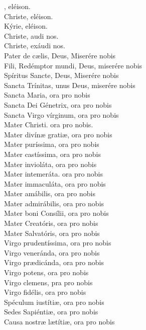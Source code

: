 \documentclass[9pt]{article}
\begin{document}
\begin{multicols*}{2}
    , eléison.\\
    Christe, eléison.\\
    Kýrie, eléison.\\
    Christe, audi nos.\\
    Christe, exáudi nos.\\
    Pater de c{\ae}lis, Deus, Miserére nobis\\
    Fili, Redémptor mundi, Deus, miserére nobis\\
    Spíritus Sancte, Deus, Miserére nobis\\
    Sancta Trínitas, unus Deus, miserére nobis\\
    Sancta Maria, ora pro nobis\\
    Sancta Dei Génetrix, ora pro nobis\\
    Sancta Virgo vírginum, ora pro nobis\\
    Mater Christi. ora pro nobis.\\
    Mater divín{\ae} grati{\ae}, ora pro nobis\\
    Mater puríssima, ora pro nobis\\
    Mater castíssima, ora pro nobis\\
    Mater invioláta, ora pro nobis\\
    Mater intemeráta. ora pro nobis\\
    Mater immaculáta, ora pro nobis\\
    Mater amábilis, ora pro nobis\\
    Mater admirábilis, ora pro nobis\\
    Mater boni Consílii, ora pro nobis\\
    Mater Creatóris, ora pro nobis\\
    Mater Salvatóris, ora pro nobis\\
    Virgo prudentíssima, ora pro nobis\\
    Virgo veneránda, ora pro nobis\\
    Virgo pr{\ae}dicánda, ora pro nobis\\
    Virgo potens, ora pro nobis\\
    Virgo clemens, pra pro nobis\\
    Virgo fidélis, ora pro nobis\\
    Spéculum iustíti{\ae}, ora pro nobis\\
    Sedes Sapiénti{\ae}, ora pro nobis\\
    Causa nostr{\ae} l{\ae}títi{\ae}, ora pro nobis\\

\end{multicols*}
\end{document}
